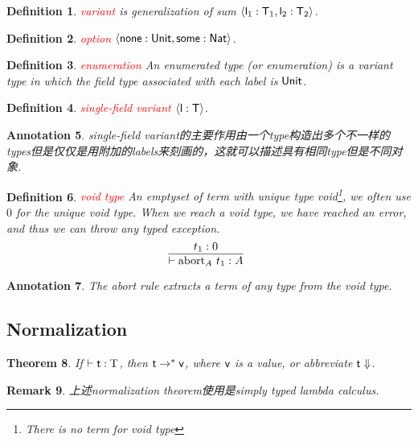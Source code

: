 \documentclass{article}
\theoremstyle{plain}
\newtheorem{theorem}{Theorem}
\newtheorem{definition}[theorem]{Definition}
\newtheorem{remark}[theorem]{Remark}
\newtheorem{annotation}[theorem]{Annotation}
\theoremstyle{nonumberplain}
\newcommand{\singletype}[1]{\text{#1}}
\newcommand{\term}[1]{\ensuremath\mathsf{#1}}
\newcommand{\redt}[1]{\textcolor{red}{#1}}
\begin{document}
\begin{definition}
\rm \redt{variant} is generalization of sum $\left<\term{l}_1:\term{T}_1, \term{l}_2:\term{T}_2\right>$. 
\end{definition}

\begin{definition}
\rm \redt{option} $\left<\term{none}:\term{Unit}, \term{some}:\term{Nat} \right>$. 
\end{definition}

\begin{definition}
\rm \redt{enumeration} An enumerated type (or enumeration) is a variant type in which the field type associated with each label is $\term{Unit}$.
\end{definition}

\begin{definition}
\rm \redt{single-field variant} $\left<\term{l}:\term{T} \right>$.
\end{definition}

\begin{annotation}
\rm single-field variant的主要作用由一个type构造出多个不一样的types但是仅仅是用附加的labels来刻画的，这就可以描述具有相同type但是不同对象.
\end{annotation}

\begin{definition}
\rm \redt{void type} An emptyset of term with unique type void\footnote{There is no term for void type}, we often use $0$ for the unique void type. When we reach a void type, we have reached an error, and thus we can throw any typed exception. 
$$
\infer[]{\vdash \text{abort}_A~t_1:A}{t_1:0}
$$  
\end{definition}

\begin{annotation}
\rm The abort rule extracts a term of any type from the void type. 
\end{annotation}

\newpage
\subsection{Normalization}

\begin{theorem}
\rm If $\vdash \term{t}:\singletype{T}$, then $\term{t} \to^* \term{v}$, where $\term{v}$ is a value, or abbreviate $\term{t}\Downarrow$. 
\end{theorem}

\begin{remark}
\rm 上述normalization theorem使用是simply typed lambda calculus. 
\end{remark}
\end{document}
